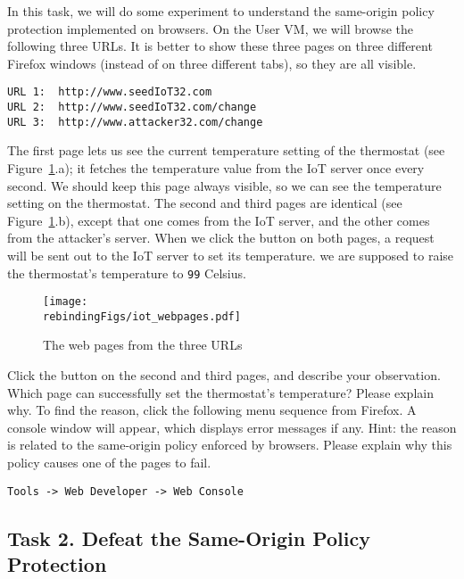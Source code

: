 In this task, we will do some experiment to understand the 
same-origin policy protection implemented on browsers. On the User VM,
we will browse the following three URLs. It is better to show these three pages on three
different Firefox windows (instead of on three different tabs), so they are all visible. 


\begin{lstlisting}
URL 1:  http://www.seedIoT32.com
URL 2:  http://www.seedIoT32.com/change
URL 3:  http://www.attacker32.com/change
\end{lstlisting}

 
The first page lets us see the current temperature setting of the thermostat (see
Figure~\ref{rebinding:fig:webpages}.a); it fetches
the temperature value from the IoT server once every second. We should keep this page always
visible, so we can see the temperature setting on the thermostat. 
The second and third pages
are identical (see Figure~\ref{rebinding:fig:webpages}.b), 
except that one comes from the IoT server, and the other comes from
the attacker's server. When we click the button on both pages, 
a request will be sent out to the IoT server to set its temperature. 
we are supposed to raise the thermostat's temperature 
to \texttt{99} Celsius.  


\begin{figure}[htb]
\begin{center}
\texttt{[image: \\rebindingFigs/iot\_webpages.pdf]}
\end{center}
\caption{The web pages from the three URLs}
\label{rebinding:fig:webpages}
\end{figure}
 

Click the button on the second and third pages, and describe your observation. Which page
can successfully set the thermostat's temperature? Please explain why. 
To find the reason, click the following menu sequence from Firefox. A console window will appear,
which displays error messages if any. Hint: the reason is related to the same-origin policy 
enforced by browsers. Please explain why this policy causes one of the pages to fail.
 
\begin{lstlisting}
Tools -> Web Developer -> Web Console
\end{lstlisting}
  


\subsection{Task 2. Defeat the Same-Origin Policy Protection}


